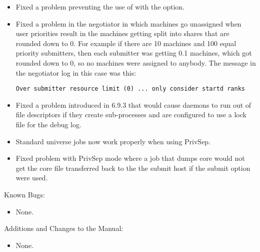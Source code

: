 \begin{itemize}
\item Fixed a problem preventing the use of  
  with the  option.

\item Fixed a problem in the negotiator in which machines go
  unassigned when user priorities result in the machines getting split
  into shares that are rounded down to 0.  For example if there are 10
  machines and 100 equal priority submitters, then each submitter was
  getting 0.1 machines, which got rounded down to 0, so no machines were
  assigned to anybody.  The message in the negotiator log in this case
  was this:

\footnotesize
\begin{verbatim}
Over submitter resource limit (0) ... only consider startd ranks
\end{verbatim}
\normalsize

\item Fixed a problem introduced in 6.9.3 that would cause daemons to
  run out of file descriptors if they create sub-processes and are
  configured to use a lock file for the debug log.

\item Standard universe jobs now work properly when using PrivSep.

\item Fixed problem with PrivSep mode where a job that dumps core would
  not get the core file transferred back to the the submit host if the
   submit option were used.

\end{itemize}

\noindent Known Bugs:

\begin{itemize}

\item None.

\end{itemize}

\noindent Additions and Changes to the Manual:

\begin{itemize}

\item None.

\end{itemize}

